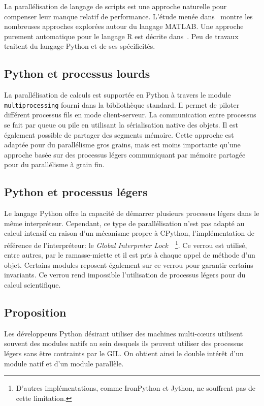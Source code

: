 \documentclass[renpar]{compas2013}
\begin{document}
La parallélisation de langage de scripts est une approche naturelle pour
compenser leur manque relatif de performance. L'étude menée
dans~\cite{choy05} montre les nombreuses approches explorées autour du
langage MATLAB. Une approche purement automatique pour le langage R est
décrite dans~\cite{mals07}. Peu de travaux traitent du langage Python et
de ses spécificités.

\subsection{Python et processus lourds}

La parallélisation de calculs est supportée en Python à travers le module
\texttt{multiprocessing} fourni dans la bibliothèque standard.  Il permet
de piloter différent processus fils en mode client-serveur. La
communication entre processus se fait par queue ou pile en utilisant la
sérialisation native des objets. Il est également possible de partager des
segments mémoire. Cette approche est adaptée pour du parallélisme gros
grains, mais est moins importante qu'une approche basée sur des processus
légers communiquant par mémoire partagée pour du parallélisme à grain fin.

\subsection{Python et processus légers}

Le langage Python offre la capacité de démarrer plusieurs processus légers
dans le même interpréteur. Cependant, ce type de parallélisation n'est pas
adapté au calcul intensif en raison d'un mécanisme propre à CPython,
l'implémentation de référence de l'interpréteur: le \emph{Global
Interpreter Lock}~\cite{gil2012}~\footnote{D'autres implémentations, comme
IronPython et Jython, ne souffrent pas de cette limitation.}. Ce verrou
est utilisé, entre autres, par le ramasse-miette et il est pris à chaque
appel de méthode d'un objet.  Certains modules reposent également sur ce
verrou pour garantir certains invariants. Ce verrou rend impossible
l'utilisation de processus légers pour du calcul scientifique.

\subsection{Proposition}

Les développeurs Python désirant utiliser des machines multi-cœurs
utilisent souvent des modules natifs au sein desquels ils peuvent utiliser
des processus légers sans être contraints par le GIL. On obtient ainsi le
double intérêt d'un module natif et d'un module parallèle.
\end{document}
